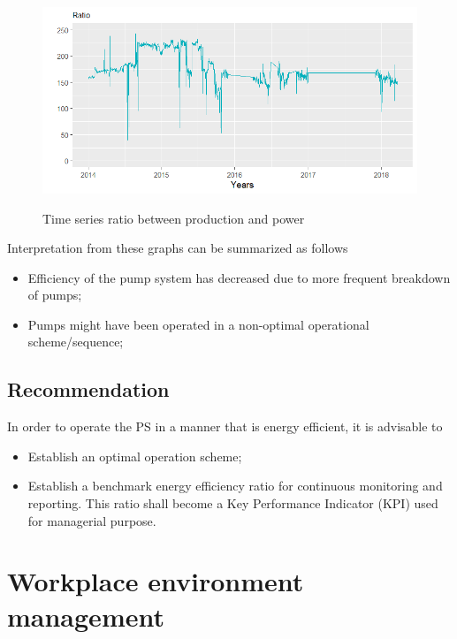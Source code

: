 \begin{figure}[!htb]
	\includegraphics[scale=0.6]{figures/ch05_fig_energy_ratio} \\
	\caption{Time series ratio between production and power}
	\label{ch05_fig_energy_ratio} 
\end{figure}

Interpretation from these graphs can be summarized as follows

\begin{itemize}
	\item Efficiency of the pump system has decreased due to more frequent breakdown of pumps;
	\item Pumps might have been operated in a non-optimal operational scheme/sequence;
\end{itemize}

\subsection{Recommendation}
In order to operate the PS in a manner that is energy efficient, it is advisable to 

\begin{itemize}
\item Establish an optimal operation scheme;
\item Establish a benchmark energy efficiency ratio for continuous monitoring and reporting. This ratio shall become a Key Performance Indicator (KPI) used for managerial purpose.
\end{itemize}


\section{Workplace environment management}
\label{47}


